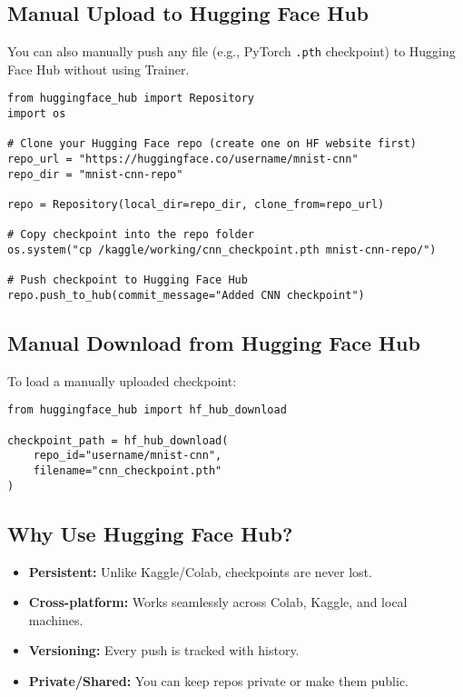 \documentclass[a4paper, 12pt]{article}
\begin{document}
\subsection*{Manual Upload to Hugging Face Hub}
You can also manually push any file (e.g., PyTorch \texttt{.pth} checkpoint) to Hugging Face Hub without using Trainer.

\begin{tcolorbox}[colback=orange!5!white, colframe=orange!85!black, title=Manual Push to Hugging Face Hub]
\begin{verbatim}
from huggingface_hub import Repository
import os

# Clone your Hugging Face repo (create one on HF website first)
repo_url = "https://huggingface.co/username/mnist-cnn"
repo_dir = "mnist-cnn-repo"

repo = Repository(local_dir=repo_dir, clone_from=repo_url)

# Copy checkpoint into the repo folder
os.system("cp /kaggle/working/cnn_checkpoint.pth mnist-cnn-repo/")

# Push checkpoint to Hugging Face Hub
repo.push_to_hub(commit_message="Added CNN checkpoint")
\end{verbatim}
\end{tcolorbox}

\subsection*{Manual Download from Hugging Face Hub}
To load a manually uploaded checkpoint:

\begin{tcolorbox}[colback=red!5!white, colframe=red!75!black, title=Manual Download Example]
\begin{verbatim}
from huggingface_hub import hf_hub_download

checkpoint_path = hf_hub_download(
    repo_id="username/mnist-cnn", 
    filename="cnn_checkpoint.pth"
)
\end{verbatim}
\end{tcolorbox}

\subsection*{Why Use Hugging Face Hub?}
\begin{itemize}
    \item \textbf{Persistent:} Unlike Kaggle/Colab, checkpoints are never lost.
    \item \textbf{Cross-platform:} Works seamlessly across Colab, Kaggle, and local machines.
    \item \textbf{Versioning:} Every push is tracked with history.
    \item \textbf{Private/Shared:} You can keep repos private or make them public.
\end{itemize}
\end{document}
